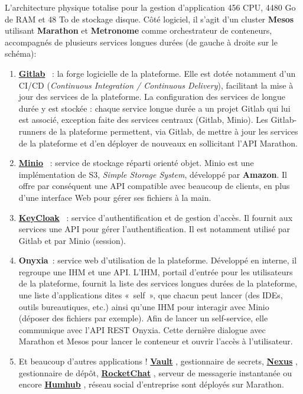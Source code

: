 L'architecture physique totalise pour la gestion d'application 456 CPU, 4480 Go de RAM et 48 To de stockage disque. Côté logiciel, il s'agit d'un cluster \textbf{Mesos} utilisant \textbf{Marathon} et \textbf{Metronome} comme orchestrateur de conteneurs, accompagnés de plusieurs services longues durées (de gauche à droite sur le schéma):
\begin{enumerate}
    \item \href{https://about.gitlab.com/}{\textbf{Gitlab}} \cite{gitlab}~: la forge logicielle de la plateforme. Elle est dotée notamment d'un CI/CD (\textit{Continuous Integration / Continuous Delivery}), facilitant la mise à jour des services de la plateforme. La configuration des services de longue durée y est stockée : chaque service longue durée a un projet Gitlab qui lui est associé, exception faite des services centraux (Gitlab, Minio). Les Gitlab-runners de la plateforme permettent, via Gitlab, de mettre à jour les services de la plateforme et d'en déployer de nouveaux en sollicitant l'API Marathon.
    \vspace{5pt}
    \item \href{https://min.io/}{\textbf{Minio}} \cite{minio}~: service de stockage réparti orienté objet. Minio est une implémentation de S3, \textit{Simple Storage System}, développé par \textbf{Amazon}. Il offre par conséquent une API compatible avec beaucoup de clients, en plus d'une interface Web pour gérer ses fichiers à la main.
    \vspace{5pt}
    \item \href{https://www.keycloak.org/}{\textbf{KeyCloak}} \cite{keycloak}~: service d'authentification et de gestion d'accès. Il fournit aux services une API pour gérer l'authentification. Il est notamment utilisé par Gitlab et par Minio (session).
    \vspace{5pt}
    \item \textbf{Onyxia}~: service web d'utilisation de la plateforme. Développé en interne, il regroupe une IHM et une API. L'IHM, portail d'entrée pour les utilisateurs de la plateforme, fournit la liste des services longues durées de la plateforme, une liste d'applications dites «~self~», que chacun peut lancer (des IDEs, outils bureautiques, etc.) ainsi qu'une IHM pour interagir avec Minio (déposer des fichiers par exemple). Afin de lancer un self-service, elle communique avec l'API REST Onyxia. Cette dernière dialogue avec Marathon et Mesos pour lancer le conteneur et ouvrir l'accès à l'utilisateur.
    \vspace{5pt}
    \item Et beaucoup d'autres applications ! \href{https://www.vaultproject.io/}{\textbf{Vault}} \cite{vault}, gestionnaire de secrets, \href{https://fr.sonatype.com/nexus-repository-sonatype}{\textbf{Nexus}} \cite{nexus}, gestionnaire de dépôt, \href{https://rocket.chat/}{\textbf{RocketChat}} \cite{rocketchat}, serveur de messagerie instantanée ou encore \href{https://humhub.org}{\textbf{Humhub}} \cite{humhub}, réseau social d'entreprise sont déployés sur Marathon.
    \newline
\end{enumerate}

